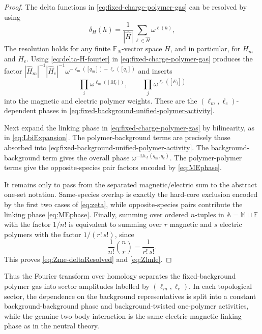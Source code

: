 \documentclass[dvipsnames,a4paper]{article}
\numberwithin{equation}{section}
\theoremstyle{definition}
\theoremstyle{remark}
\newcommand{\Lk}{\mathrm{Lk}}
\begin{document}
\begin{proof}
	The delta functions in \eqref{eq:fixed-charge-polymer-gas} can be resolved by using
	\begin{equation}
		\delta_H(h) = \frac{1}{|\widehat H|} \sum_{\ell \in \widehat H} \omega^{\ell(h)}, \label{eq:delta-H-fourier}
	\end{equation}
	The resolution holds for any finite $\mathbb F_N$-vector space $H$, and in particular, for $H_m$ and $H_e$. Using \eqref{eq:delta-H-fourier} in
	\eqref{eq:fixed-charge-polymer-gas} produces the factor $|\widehat H_m|^{-1}|\widehat H_e|^{-1}
	\omega^{-\ell_m([q_m])-\ell_e([q_e])}$
	and inserts
	\[
	\prod_i\omega^{\ell_m([M_i])},
	\qquad
	\prod_j\omega^{\ell_e([E_j])}
	\]
	into the magnetic and electric polymer weights. These are the $(\ell_m,\ell_e)$-dependent phases in \eqref{eq:fixed-background-unified-polymer-activity}.
	
	Next expand the linking phase in \eqref{eq:fixed-charge-polymer-gas} by bilinearity, as in \eqref{eq:LbiExpansion}. The polymer-background terms are precisely those absorbed into \eqref{eq:fixed-background-unified-polymer-activity}. The background-background term gives
	the overall phase
	\(\omega^{-\Lk_{\underline\Lambda}(q_m,q_e)}\). The polymer-polymer terms
	give the opposite-species pair factors encoded by \eqref{eq:MEphase}.
	
	It remains only to pass from the separated magnetic/electric sum to the abstract
	one-set notation. Same-species overlap is exactly the hard-core exclusion encoded by the
	first two cases of \eqref{eq:zeta}, while opposite-species pairs contribute the linking phase
	\eqref{eq:MEphase}. Finally, summing over ordered \(n\)-tuples in
	\(\mathbb A=\mathbb M \sqcup \mathbb E\) with the factor
	\(1/n!\) is equivalent to summing over \(r\) magnetic and \(s\) electric polymers with
	the factor \(1/(r!\,s!)\), since
	\[
	\frac{1}{n!}\binom{n}{r}
	=
	\frac{1}{r!\,s!}.
	\]
	This proves \eqref{eq:Zme-deltaResolved} and \eqref{eq:Zlmle}.
\end{proof}

Thus the Fourier transform over homology separates the fixed-background polymer gas into
sector amplitudes labelled by \((\ell_m,\ell_e)\). In each topological sector, the dependence on the
background representatives is split into a constant background-background phase and
background-twisted one-polymer activities, while the genuine two-body interaction is the
same electric-magnetic linking phase as in the neutral theory.
\end{document}
